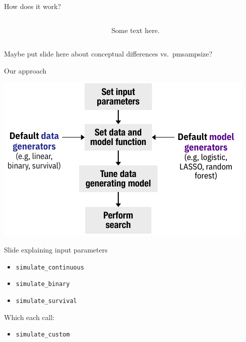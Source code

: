 \documentclass[11pt]{beamer}
\begin{document}
\begin{frame}[c,fragile]{How does it work?}
\begin{columns}
\begin{column}[c]{0.5\textwidth}
        \end{column}
        \begin{column}[c]{0.5\textwidth}
            Some text here.
    
        \end{column}
    \end{columns}

\end{frame}

\begin{frame}[t]{Maybe put slide here about conceptual differences vs.\ pmsampsize?}

\end{frame}

\begin{frame}[c]{Our approach}

	\includegraphics[width=\textwidth]{figures/workflow1.pdf}

\end{frame}

\begin{frame}[t]{Slide explaining input parameters}

	\begin{itemize}
		\item \texttt{simulate\_continuous}
		\item \texttt{simulate\_binary}
		\item \texttt{simulate\_survival}
	\end{itemize}

	Which each call:

	\begin{itemize}
		\item \texttt{simulate\_custom}
	\end{itemize}

\end{frame}
\end{document}
